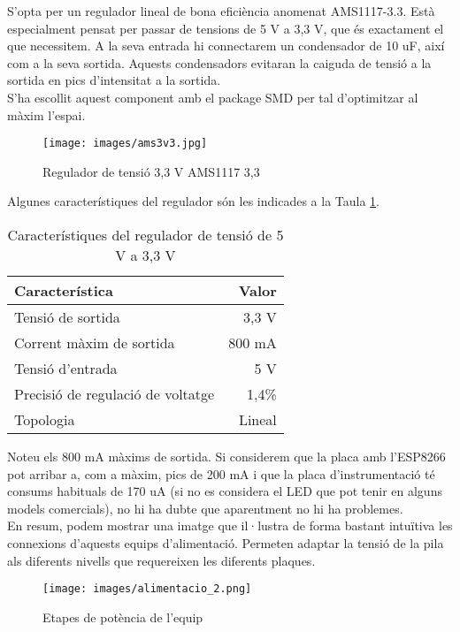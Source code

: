 \newline S'opta per un regulador lineal de bona eficiència anomenat AMS1117-3.3. Està especialment pensat per passar de tensions de 5 V a 3,3 V, que és exactament el que necessitem. A la seva entrada hi connectarem un condensador de 10 uF, així com a la seva sortida. Aquests condensadors evitaran la caiguda de tensió a la sortida en pics d'intensitat a la sortida.\\
\newline S'ha escollit aquest component amb el package SMD per tal d'optimitzar al màxim l'espai.
\begin{figure}[H]
\begin{center}
\texttt{[image: images/ams3v3.jpg]}
\end{center}
\caption{Regulador de tensió 3,3 V AMS1117 3,3}
\label{fig: 3v3}
\end{figure}
%
%
\noindent Algunes característiques del regulador són les indicades a la Taula \ref{tab:regulador2}.
\begin{table}[H]
\small
\begin{center}
 \begin{tabular} {|l|r|}%
 \hline
 Característica & Valor \\
 \hline \hline 
Tensió de sortida & 3,3 V \\ \hline
Corrent màxim de sortida & 800 mA\\ \hline
Tensió d'entrada & 5 V \\ \hline
Precisió de regulació de voltatge & 1,4\% \\ \hline
Topologia & Lineal \\ \hline
 \end{tabular}
 \caption{Característiques del regulador de tensió de 5 V a 3,3 V}
 \label{tab:regulador2}
\end{center}
\end{table}
%
\noindent Noteu els 800 mA màxims de sortida. Si considerem que la placa amb l'ESP8266 pot arribar a, com a màxim, pics de 200 mA i que la placa d'instrumentació té consums habituals de 170 uA (si no es considera el LED que pot tenir en alguns models comercials), no hi ha dubte que aparentment no hi ha problemes.\\
\newline En resum, podem mostrar una imatge que il·lustra de forma bastant intuïtiva les connexions d'aquests equips d'alimentació. Permeten adaptar la tensió de la pila als diferents nivells que requereixen les diferents plaques.
\begin{figure}[H]
\begin{center}
\texttt{[image: images/alimentacio\_2.png]}
\end{center}
\caption{Etapes de potència de l'equip}
\label{fig:alimentacio}
\end{figure}


